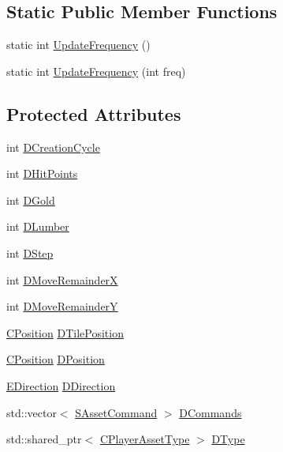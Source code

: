 \subsection*{Static Public Member Functions}
\begin{DoxyCompactItemize}
\item 
static int \hyperlink{classCPlayerAsset_a0aff85b9552967a42f4f3f42cb59c19f}{Update\+Frequency} ()
\item 
static int \hyperlink{classCPlayerAsset_ad53a2f58bcbccb7995431e8e2d050c09}{Update\+Frequency} (int freq)
\end{DoxyCompactItemize}
\subsection*{Protected Attributes}
\begin{DoxyCompactItemize}
\item 
int \hyperlink{classCPlayerAsset_a8b0efb3ddc27ee11f331ade667bc4b0d}{D\+Creation\+Cycle}
\item 
int \hyperlink{classCPlayerAsset_a331750935bf594e665544085fb74e89d}{D\+Hit\+Points}
\item 
int \hyperlink{classCPlayerAsset_ab90ebdc73c6794fd44ddbe273f610292}{D\+Gold}
\item 
int \hyperlink{classCPlayerAsset_af726ea7df9596f02cdb1428d61186349}{D\+Lumber}
\item 
int \hyperlink{classCPlayerAsset_a7964d2161d51b3edd66fbc9c59eba4b0}{D\+Step}
\item 
int \hyperlink{classCPlayerAsset_aa57d93e239e9a80c362949f260471456}{D\+Move\+RemainderX}
\item 
int \hyperlink{classCPlayerAsset_a282502fea7d02e38aa40a538a9c1565e}{D\+Move\+RemainderY}
\item 
\hyperlink{classCPosition}{C\+Position} \hyperlink{classCPlayerAsset_a5b59a9d3b7db8c7fa194b80dafb96186}{D\+Tile\+Position}
\item 
\hyperlink{classCPosition}{C\+Position} \hyperlink{classCPlayerAsset_aa9f53c009b181c7c5647c6b03776a04c}{D\+Position}
\item 
\hyperlink{GameDataTypes_8h_acb2b033915f6659a71a38b5aa6e4eb42}{E\+Direction} \hyperlink{classCPlayerAsset_a2f07e280268d0402220c583d1029d683}{D\+Direction}
\item 
std\+::vector$<$ \hyperlink{structSAssetCommand}{S\+Asset\+Command} $>$ \hyperlink{classCPlayerAsset_a4d3b96106d3b1c1020f98005884d2a87}{D\+Commands}
\item 
std\+::shared\+\_\+ptr$<$ \hyperlink{classCPlayerAssetType}{C\+Player\+Asset\+Type} $>$ \hyperlink{classCPlayerAsset_a5d61f73471e1e6f0a6ab15f2ffa7b359}{D\+Type}
\end{DoxyCompactItemize}
